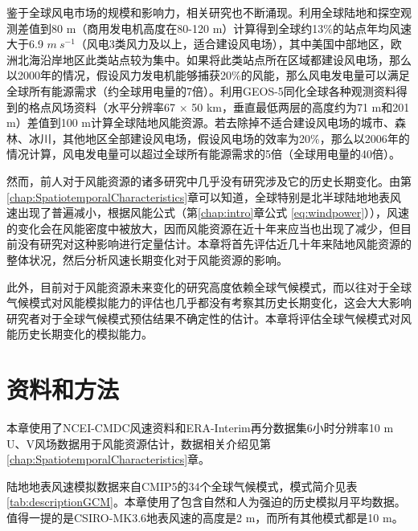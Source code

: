 鉴于全球风电市场的规模和影响力，相关研究也不断涌现。\citet{archer2005evaluation}利用全球陆地和探空观测差值到80 m（商用发电机高度在80-120 m）计算得到全球约13\%的站点年均风速大于6.9 $m ~ s^{-1}$（风电3类风力及以上，适合建设风电场），其中美国中部地区，欧洲北海沿岸地区此类站点较为集中。如果将此类站点所在区域都建设风电场，那么以2000年的情况，假设风力发电机能够捕获20\%的风能，那么风电发电量可以满足全球所有能源需求（约全球用电量的7倍）。\citet{lu2009global}利用GEOS-5同化全球各种观测资料得到的格点风场资料（水平分辨率67 $\times$ 50 km，垂直最低两层的高度约为71 m和201 m）差值到100 m计算全球陆地风能资源。若去除掉不适合建设风电场的城市、森林、冰川，其他地区全部建设风电场，假设风电场的效率为20\%，那么以2006年的情况计算，风电发电量可以超过全球所有能源需求的5倍（全球用电量的40倍）。

然而，前人对于风能资源的诸多研究中几乎没有研究涉及它的历史长期变化。由第\ref{chap:SpatiotemporalCharacteristics}章可以知道，全球特别是北半球陆地地表风速出现了普遍减小，根据风能公式（第\ref{chap:intro}章公式 \ref{eq:windpower}）），风速的变化会在风能密度中被放大，因而风能资源在近十年来应当也出现了减少，但目前没有研究对这种影响进行定量估计。本章将首先评估近几十年来陆地风能资源的整体状况，然后分析风速长期变化对于风能资源的影响。

此外，目前对于风能资源未来变化的研究高度依赖全球气候模式\citep{pryor2011assessing, karnauskas2018southward}，而以往对于全球气候模式对风能模拟能力的评估也几乎都没有考察其历史长期变化，这会大大影响研究者对于全球气候模式预估结果不确定性的估计。本章将评估全球气候模式对风能历史长期变化的模拟能力。

\section{资料和方法}

本章使用了NCEI-CMDC风速资料和ERA-Interim再分数据集6小时分辨率10 m U、V风场数据用于风能资源估计，数据相关介绍见第\ref{chap:SpatiotemporalCharacteristics}章。

陆地地表风速模拟数据来自CMIP5的34个全球气候模式，模式简介见表 \ref{tab:descriptionGCM}。本章使用了包含自然和人为强迫的历史模拟月平均数据。值得一提的是CSIRO-MK3.6地表风速的高度是2 m，而所有其他模式都是10 m。

